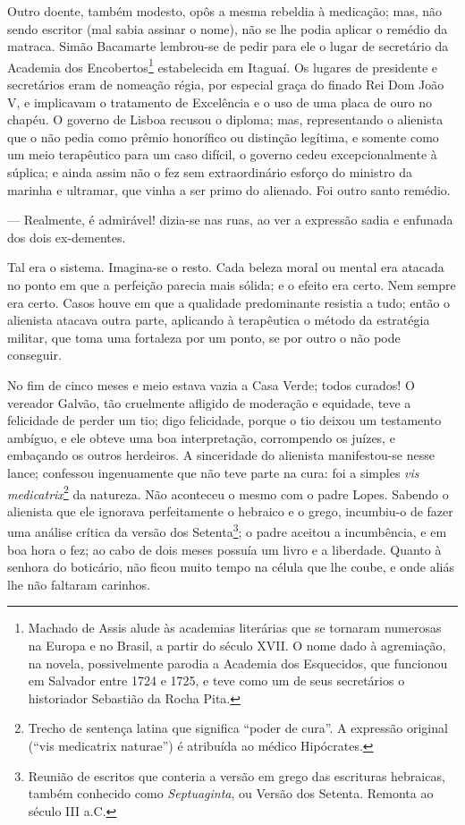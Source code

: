Outro doente, também modesto, opôs a mesma rebeldia à medicação; mas,
não sendo escritor (mal sabia assinar o nome), não se lhe podia aplicar
o remédio da matraca. Simão Bacamarte lembrou-se de pedir para ele o
lugar de secretário da Academia dos Encobertos\footnote{Machado de Assis
  alude às academias literárias que se tornaram numerosas na Europa e no
  Brasil, a partir do século XVII. O nome dado à agremiação, na novela,
  possivelmente parodia a Academia dos Esquecidos, que funcionou em
  Salvador entre 1724 e 1725, e teve como um de seus secretários o
  historiador Sebastião da Rocha Pita.} estabelecida em Itaguaí. Os
lugares de presidente e secretários eram de nomeação régia, por especial
graça do finado Rei Dom João V, e implicavam o tratamento de Excelência
e o uso de uma placa de ouro no chapéu. O governo de Lisboa recusou o
diploma; mas, representando o alienista que o não pedia como prêmio
honorífico ou distinção legítima, e somente como um meio terapêutico
para um caso difícil, o governo cedeu excepcionalmente à súplica; e
ainda assim não o fez sem extraordinário esforço do ministro da marinha
e ultramar, que vinha a ser primo do alienado. Foi outro santo remédio.

--- Realmente, é admirável! dizia-se nas ruas, ao ver a expressão sadia
e enfunada dos dois ex-dementes.

Tal era o sistema. Imagina-se o resto. Cada beleza moral ou mental era
atacada no ponto em que a perfeição parecia mais sólida; e o efeito era
certo. Nem sempre era certo. Casos houve em que a qualidade predominante
resistia a tudo; então o alienista atacava outra parte, aplicando à
terapêutica o método da estratégia militar, que toma uma fortaleza por
um ponto, se por outro o não pode conseguir.

No fim de cinco meses e meio estava vazia a Casa Verde; todos curados! O
vereador Galvão, tão cruelmente afligido de moderação e equidade, teve a
felicidade de perder um tio; digo felicidade, porque o tio deixou um
testamento ambíguo, e ele obteve uma boa interpretação, corrompendo os
juízes, e embaçando os outros herdeiros. A sinceridade do alienista
manifestou-se nesse lance; confessou ingenuamente que não teve parte na
cura: foi a simples \emph{vis medicatrix}\footnote{Trecho de sentença
  latina que significa ``poder de cura''. A expressão original (``vis
  medicatrix naturae'') é atribuída ao médico Hipócrates.} da natureza.
Não aconteceu o mesmo com o padre Lopes. Sabendo o alienista que ele
ignorava perfeitamente o hebraico e o grego, incumbiu-o de fazer uma
análise crítica da versão dos Setenta\footnote{Reunião de escritos que
  conteria a versão em grego das escrituras hebraicas, também conhecido
  como \emph{Septuaginta}, ou Versão dos Setenta. Remonta ao século III
  a.C.}; o padre aceitou a incumbência, e em boa hora o fez; ao cabo de
dois meses possuía um livro e a liberdade. Quanto à senhora do
boticário, não ficou muito tempo na célula que lhe coube, e onde aliás
lhe não faltaram carinhos.

